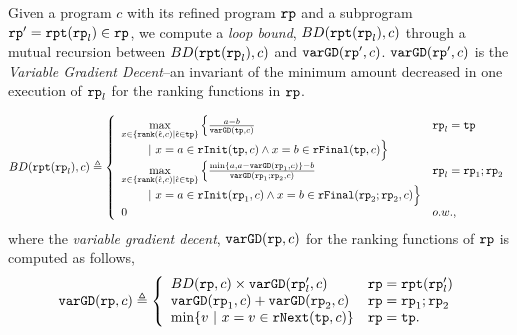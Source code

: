 \begin{defn}
\label{def:loopbound}
Given a program $c$ with its refined program $\mathtt{rp}$ and a subprogram $\mathtt{rp}' = \mathtt{rpt}(\mathtt{rp}_l) \in \mathtt{rp}$, we compute a \emph{loop bound}, $BD(\mathtt{rpt}(\mathtt{rp}_l), c)$
through a mutual recursion between  $BD(\mathtt{rpt}(\mathtt{rp}_l), c)$ and $\mathtt{varGD}(\mathtt{rp}', c)$.
$\mathtt{varGD}(\mathtt{rp}', c)$ is the \emph{Variable Gradient Decent}--an invariant of the minimum amount decreased in one execution of $\mathtt{rp}_l$ for the ranking functions in $\mathtt{rp}$.

 \[
  BD(\rprepeat(\rprog_l), c)\triangleq
 \left\{ 
 \begin{array}{ll}
 \max\limits_{x \in \left\{ \rank(\absevent, c) | \absevent \in \tpath \right\}} 
 \Big\{ {\frac{a - b}{\varGD(\tpath, c)}} & \rprog_l = \tpath
 \\ \qquad 
 ~\vert~
 x = a \in \rfinit(\tpath, c)
 \land x = b \in \rffinal(\tpath, c)
 \Big\} 
 \\
 \max\limits_{x \in \left\{ \rank(\absevent, c) | \absevent \in \tpath \right\}} 
 \Big\{ {\frac{\min\{ a, a - \varGD(\rprog_1, c) \} - b}{\varGD(\rprog_1;\rprog_2, c)}} 
 & \rprog_l = \rprog_1;\rprog_2
 \\ \qquad 
 ~\vert~
 x = a \in \rfinit(\rprog_1, c)
 \land x = b \in \rffinal(\rprog_2;\rprog_2, c)
 \Big\} \\
 0 & o.w.,
 \end{array} 
 \right.
\]
where the \emph{variable gradient decent},
$\mathtt{varGD}(\mathtt{rp}, c)$ for the ranking functions of $\mathtt{rp}$ is computed as follows,
\[
  \varGD(\rprog, c) \triangleq
 \left\{
 \begin{array}{ll}
 BD(\rprog, c) \times {\varGD(\rprog_l', c)} & \rprog = \rprepeat(\rprog_l') \\
 \varGD(\rprog_1, c) + \varGD(\rprog_2, c) & \rprog = \rprog_1;\rprog_2 \\
 \min\left\{v ~|~ x = v \in \rfnext(\tpath, c) \right\} & \rprog = \tpath.
 \end{array}
 \right.
 \]


\end{defn}
